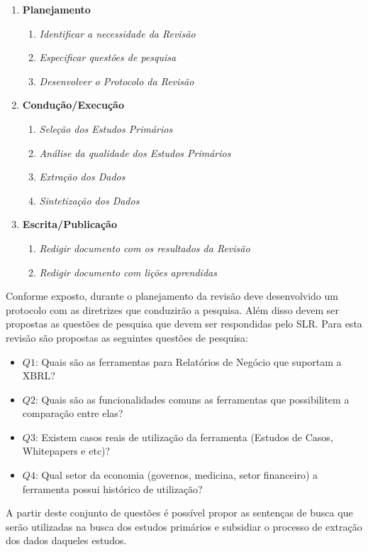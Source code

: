 \documentclass[12pt]{article}
\begin{document}
\begin{enumerate}
  \item \textbf{Planejamento}
  \begin{enumerate}
    \item \textit{Identificar a necessidade da Revisão}
    \item \textit{Especificar questões de pesquisa}
    \item \textit{Desenvolver o Protocolo da Revisão}
  \end{enumerate}
  \item \textbf{Condução/Execução}
  \begin{enumerate}
    \item \textit{Seleção dos Estudos Primários}
    \item \textit{Análise da qualidade dos Estudos Primários}
     \item \textit{Extração dos Dados}
     \item \textit{Sintetização dos Dados}
   \end{enumerate}
  \item \textbf{Escrita/Publicação}
  \begin{enumerate}
    \item \textit{Redigir documento com os resultados da Revisão}
    \item \textit{Redigir documento com lições aprendidas}
  \end{enumerate}
\end{enumerate}

Conforme exposto, durante o planejamento da revisão deve desenvolvido um
protocolo com as diretrizes que conduzirão a pesquisa. Além disso devem ser
propostas as questões de pesquisa que devem ser respondidas pelo SLR. Para
esta revisão são propostas as seguintes questões de pesquisa:

\begin{itemize}

  \item \textbf{$Q1$}: Quais são as ferramentas para Relatórios de Negócio que
    suportam a XBRL?
  \item \textbf{$Q2$}: Quais são as funcionalidades comuns as ferramentas
    que possibilitem a comparação entre elas?
  \item \textbf{$Q3$}: Existem casos reais de utilização da ferramenta
    (Estudos de Casos, Whitepapers e etc)?
  \item \textbf{$Q4$}: Qual setor da economia (governos, medicina, setor financeiro) a ferramenta possui histórico de utilização?

\end{itemize}
A partir deste conjunto de questões é possível propor as sentenças de busca que
serão utilizadas na busca dos estudos primários e subsidiar o processo de
extração dos dados daqueles estudos.
\end{document}
